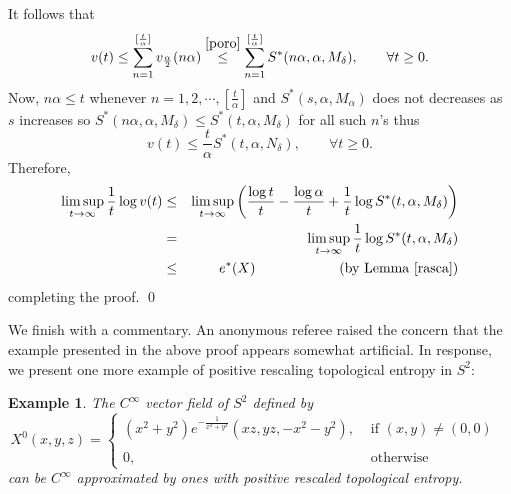 \documentclass{amsart}
\newtheorem{ex}{Example}
\numberwithin{equation}{section}
\begin{document}
It follows that
$$
v(t)\leq \sum_{n=1}^{[\frac{t}\alpha]}v_{\frac{\alpha}2}(n\alpha)\overset{\eqref{poro}}{\leq} \sum_{n=1}^{[\frac{t}\alpha]} S^*(n\alpha,\alpha,M_\delta),\quad\quad\forall t\geq0.
$$
Now, $n\alpha\leq t$ whenever $n=1,2,\cdots, [\frac{t}\alpha]$
and $S^*(s,\alpha,M_\alpha)$ does not decreases as $s$ increases so
$S^*(n\alpha,\alpha,M_\delta)\leq S^*(t,\alpha,M_\delta)$ for all such $n$'s thus
$$
v(t)\leq \frac{t}\alpha S^*(t,\alpha,N_\delta),\quad\quad\forall t\geq0.
$$
Therefore,
\begin{eqnarray*}
\limsup_{t\to\infty}\frac{1}t\log v(t)&\leq& \limsup_{t\to\infty}\left(\frac{\log t}t-\frac{\log\alpha}t+\frac{1}t\log S^*(t,\alpha,M_\delta)\right)\\
&=&\limsup_{t\to\infty}\frac{1}t\log S^*(t,\alpha,M_\delta)\\
&\leq& e^*(X) \quad\quad\quad\quad\quad\quad\mbox{(by Lemma \ref{rasca})}
\end{eqnarray*}
completing the proof.
\qed

\medskip

We finish with a commentary. An
anonymous referee raised the concern that the example presented in the above proof appears somewhat artificial. In response, we present one more example of positive rescaling topological entropy in $S^2$:


\begin{ex}
\label{eno}
The $C^\infty$ vector field of $S^2$ defined by
$$
X^0(x,y,z)=
\left\{\begin{array}{rcl}
(x^2+y^2)e^{-\frac{1}{x^2+y^2}}(xz,yz,-x^2-y^2), & \mbox{ if } (x,y)\neq (0,0)\\
& & \\
0, &\mbox{ otherwise}
\end{array}
\right.
$$
can be $C^\infty$ approximated by ones with positive rescaled topological entropy.
\end{ex}
\end{document}
